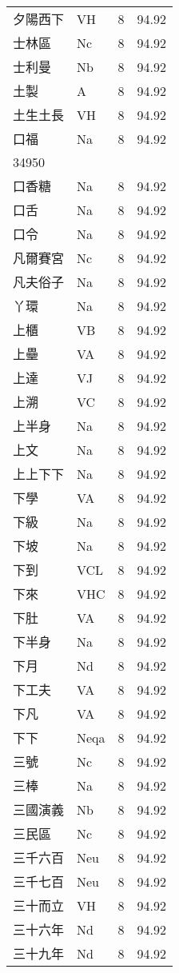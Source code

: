 \documentclass[twocolumn]{book}
\begin{document}
\begin{supertabular}{llrr}
夕陽西下 & VH & 8 &  94.92\\
士林區 & Nc & 8 &  94.92\\
士利曼 & Nb & 8 &  94.92\\
土製 & A & 8 &  94.92\\
土生土長 & VH & 8 &  94.92\\
口福 & Na & 8 &  94.92\\
34950\\
口香糖 & Na & 8 &  94.92\\
口舌 & Na & 8 &  94.92\\
口令 & Na & 8 &  94.92\\
凡爾賽宮 & Nc & 8 &  94.92\\
凡夫俗子 & Na & 8 &  94.92\\
丫環 & Na & 8 &  94.92\\
上櫃 & VB & 8 &  94.92\\
上壘 & VA & 8 &  94.92\\
上達 & VJ & 8 &  94.92\\
上溯 & VC & 8 &  94.92\\
上半身 & Na & 8 &  94.92\\
上文 & Na & 8 &  94.92\\
上上下下 & Na & 8 &  94.92\\
下學 & VA & 8 &  94.92\\
下級 & Na & 8 &  94.92\\
下坡 & Na & 8 &  94.92\\
下到 & VCL & 8 &  94.92\\
下來 & VHC & 8 &  94.92\\
下肚 & VA & 8 &  94.92\\
下半身 & Na & 8 &  94.92\\
下月 & Nd & 8 &  94.92\\
下工夫 & VA & 8 &  94.92\\
下凡 & VA & 8 &  94.92\\
下下 & Neqa & 8 &  94.92\\
三號 & Nc & 8 &  94.92\\
三棒 & Na & 8 &  94.92\\
三國演義 & Nb & 8 &  94.92\\
三民區 & Nc & 8 &  94.92\\
三千六百 & Neu & 8 &  94.92\\
三千七百 & Neu & 8 &  94.92\\
三十而立 & VH & 8 &  94.92\\
三十六年 & Nd & 8 &  94.92\\
三十九年 & Nd & 8 &  94.92\\

\end{supertabular}
\end{document}
